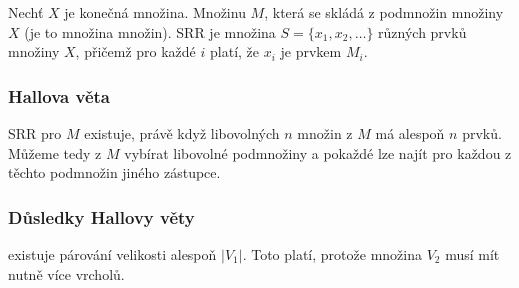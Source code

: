 Nechť $X$ je konečná množina.
Množinu $M$, která se skládá z podmnožin množiny $X$ (je to množina množin).
SRR je množina $S = \{x_1, x_2, \ldots\}$ různých prvků množiny $X$, přičemž pro každé $i$ platí, že $x_i$ je prvkem $M_i$.

\subsubsection{Hallova věta}

SRR pro $M$ existuje, právě když libovolných $n$ množin z $M$ má alespoň $n$ prvků.
Můžeme tedy z $M$ vybírat libovolné podmnožiny a pokaždé lze najít pro každou z těchto podmnožin jiného zástupce.

\subsubsection{Důsledky Hallovy věty}

 existuje párování velikosti alespoň $|V_1|$.
Toto platí, protože množina $V_2$ musí mít nutně více vrcholů.